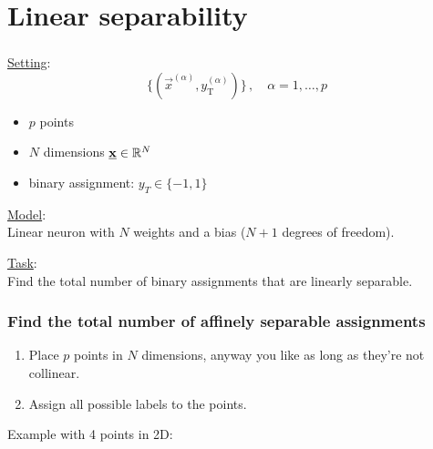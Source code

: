 \section{Linear separability}


\begin{frame}\frametitle{\secname}

\underline{Setting}:\\

\begin{equation*}
\Big\{ \left(\vec x^{(\alpha)}, y^{(\alpha)}_{\mathrm{T}} \right) \Big\}\,,\quad \alpha = 1,\ldots,p
\end{equation*}

\begin{itemize}
\item $p$ points
\item $N$ dimensions $\underline{\mathbf{x}} \in \mathbb{R}^N$
\item binary assignment: $y_T \in \{-1,1\}$
\end{itemize}

\pause

\underline{Model}:\\

Linear neuron with $N$ weights and a bias ($N+1$ degrees of freedom).

\pause

\underline{Task}:\\

Find the total number of binary assignments that are linearly separable.

\end{frame}

\begin{frame}\frametitle{Find the total number of affinely separable assignments}

\begin{enumerate}
\item Place $p$ points in $N$ dimensions, anyway you like as long as they're not collinear.
\item Assign all possible labels to the points.
\end{enumerate}

Example with 4 points in 2D:


\\



\end{frame}


